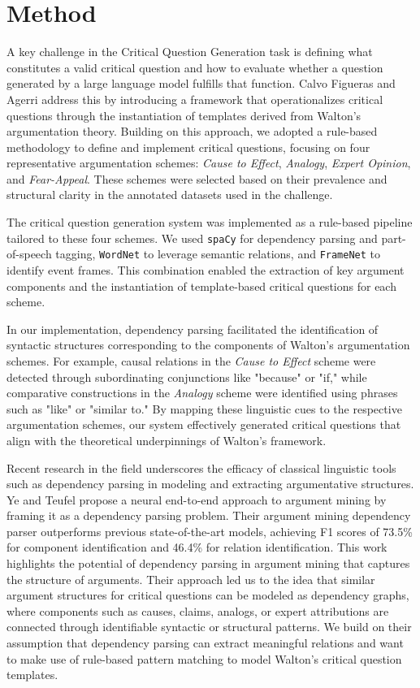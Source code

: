 \documentclass[11pt]{article}
\begin{document}
\section{Method}
A key challenge in the Critical Question Generation task is defining what constitutes a valid critical question and how to evaluate whether a question generated by a large language model fulfills that function.  Calvo Figueras and Agerri \cite{calvo_figueras_critical_2024} address this by introducing a framework that operationalizes critical questions through the instantiation of templates derived from Walton's argumentation theory. Building on this approach, we adopted a rule-based methodology to define and implement critical questions, focusing on four representative argumentation schemes: \textit{Cause to Effect}, \textit{Analogy}, \textit{Expert Opinion}, and \textit{Fear-Appeal}. These schemes were selected based on their prevalence and structural clarity in the annotated datasets used in the challenge.

The critical question generation system was implemented as a rule-based pipeline tailored to these four schemes. We used \texttt{spaCy} for dependency parsing and part-of-speech tagging, \texttt{WordNet} to leverage semantic relations, and \texttt{FrameNet} to identify event frames. This combination enabled the extraction of key argument components and the instantiation of template-based critical questions for each scheme.

In our implementation, dependency parsing facilitated the identification of syntactic structures corresponding to the components of Walton's argumentation schemes. For example, causal relations in the \textit{Cause to Effect} scheme were detected through subordinating conjunctions like "because" or "if," while comparative constructions in the \textit{Analogy} scheme were identified using phrases such as "like" or "similar to." By mapping these linguistic cues to the respective argumentation schemes, our system effectively generated critical questions that align with the theoretical underpinnings of Walton's framework.

Recent research in the field underscores the efficacy of classical linguistic tools such as dependency parsing in modeling and extracting argumentative structures. Ye and Teufel \cite{ye-teufel-2021-end} propose a neural end-to-end approach to argument mining by framing it as a dependency parsing problem. Their argument mining dependency parser outperforms previous state-of-the-art models, achieving F1 scores of 73.5\% for component identification and 46.4\% for relation identification. This work highlights the potential of dependency parsing in argument mining that captures the structure of arguments. Their approach led us to the idea that similar argument structures for critical questions can be modeled as dependency graphs, where components such as causes, claims, analogs, or expert attributions are connected through identifiable syntactic or structural patterns. We build on their assumption that dependency parsing can extract meaningful relations and want to make use of rule-based pattern matching to model Walton's critical question templates. 
\end{document}
